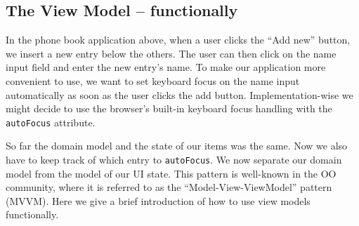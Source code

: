 \documentclass[sigplan,screen]{acmart}
\begin{document}
\subsection{The View Model -- functionally}

In the phone book application above, when a user clicks the ``Add
new'' button, we insert a new entry below the others. The user can
then click on the name input field and enter the new entry's name. To
make our application more convenient to use, we want to set keyboard
focus on the name input automatically as soon as the user clicks the
add button. Implementation-wise we might decide to use the browser's
built-in keyboard focus handling with the \texttt{autoFocus}
attribute.

So far the domain model and the state of our items was the same. Now
we also have to keep track of which entry to \texttt{autoFocus}. We
now separate our domain model from the model of our UI state. This
pattern is well-known in the OO community, where it is referred to as
the ``Model-View-ViewModel'' pattern (MVVM). Here we give a brief
introduction of how to use view models functionally.
\end{document}
